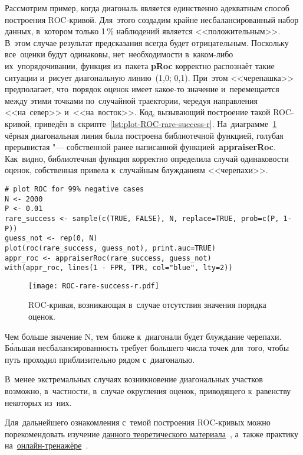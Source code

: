 \documentclass[]{scrreprt}
\begin{document}
Рассмотрим пример, когда диагональ является единственно адекватным способ построения ROC-кривой. Для~этого создадим крайне несбалансированный набор данных, в~котором только 1\,\% наблюдений является <<положительным>>. В~этом случае результат предсказания всегда будет отрицательным. Поскольку все~оценки будут одинаковы, нет~необходимости в~каком-либо их~упорядочивании, функция из~пакета \textbf{pRoc} корректно распознаёт такие ситуации и~рисует диагональную линию~(1,0; 0,1). При~этом <<черепашка>> предполагает, что~порядок оценок имеет какое-то значение и~перемещается между этими точками по~случайной траектории, чередуя направления <<на~север>> и~<<на~восток>>. Код, вызывающий построение такой ROC-кривой, приведён в~скрипте~\ref{lst:plot-ROC-rare-success-r}. На~диаграмме~\ref{fig:ROC-rare-success-r} чёрная диагональная линия была построена библиотечной функцией, голубая прерывистая "--- собственной ранее написанной функцией~\textbf{appraiserRoc}. Как~видно, библиотечная функция корректно определила случай одинаковости оценок, собственная привела к~случайным блужданиям <<черепахи>>.
%
\begin{lstlisting}[float, caption = Построение ROC-кривой в~случае отсутвия значения порядка оценок, firstnumber=1, label= lst:plot-ROC-rare-success-r]
# plot ROC for 99% negative cases
N <- 2000
P <- 0.01
rare_success <- sample(c(TRUE, FALSE), N, replace=TRUE, prob=c(P, 1-P))
guess_not <- rep(0, N)
plot(roc(rare_success, guess_not), print.auc=TRUE)
appr_roc <- appraiserRoc(rare_success, guess_not)
with(appr_roc, lines(1 - FPR, TPR, col="blue", lty=2))
\end{lstlisting}
%
\begin{figure}[ht]
	\centering
	\texttt{[image: ROC-rare-success-r.pdf]}
	\caption{ROC-кривая, возникающая в~случае отсутствия значения порядка оценок.}
	\label{fig:ROC-rare-success-r}
\end{figure}
%

Чем больше значение N, тем~ближе к~диагонали будет блуждание черепахи. Б\'{о}льшая несбалансированность требует большего числа точек для~того, чтобы путь проходил приблизительно рядом с~диагональю.

В~менее экстремальных случаях возникновение диагональных участков возможно, в~частности, в~случае округления оценок, приводящего к~равенству некоторых из~них. 

Для~дальнейшего ознакомления с~темой построения ROC-кривых можно порекомендовать изучение \href{file:///home/kaarlahti/Downloads/ROCintro.pdf}{данного теоретического материала}~\cite{ROC-analysis}, а~также практику на~\href{https://kennis-research.shinyapps.io/ROC-Curves/}{онлайн-тренажёре}~\cite{ROC-curve-practice}.
\end{document}
